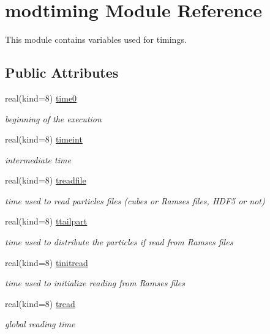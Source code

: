 \hypertarget{classmodtiming}{\section{modtiming Module Reference}
\label{classmodtiming}
}


This module contains variables used for timings.  


\subsection*{Public Attributes}
\begin{DoxyCompactItemize}
\item 
real(kind=8) \hyperlink{classmodtiming_aa15cbf8a08e28c5209481b3ed5f11090}{time0}
\begin{DoxyCompactList}\small\item\em beginning of the execution \end{DoxyCompactList}\item 
real(kind=8) \hyperlink{classmodtiming_a724cb127b8168bf0645e4070d83a34c0}{timeint}
\begin{DoxyCompactList}\small\item\em intermediate time \end{DoxyCompactList}\item 
real(kind=8) \hyperlink{classmodtiming_ab585192644ed79fc1030fde80dd84f85}{treadfile}
\begin{DoxyCompactList}\small\item\em time used to read particles files (cubes or Ramses files, H\-D\-F5 or not) \end{DoxyCompactList}\item 
real(kind=8) \hyperlink{classmodtiming_a65a8925f0685c0a5c5e42b0afd3b4a69}{ttailpart}
\begin{DoxyCompactList}\small\item\em time used to distribute the particles if read from Ramses files \end{DoxyCompactList}\item 
real(kind=8) \hyperlink{classmodtiming_a6c37469e0c299e5eb7c4b21eec1f2405}{tinitread}
\begin{DoxyCompactList}\small\item\em time used to initialize reading from Ramses files \end{DoxyCompactList}\item 
real(kind=8) \hyperlink{classmodtiming_ab77d3fc2a7e3da662677204c1c8f7e84}{tread}
\begin{DoxyCompactList}\small\item\em global reading time \end{DoxyCompactList}\item 

\end{DoxyCompactItemize}
